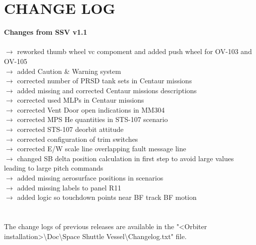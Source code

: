 \documentclass[Space_Shuttle_Vessel_Manual.tex]{subfiles}
\begin{document}
\section{CHANGE LOG}
\label{sec:change-log}
\noindent
\textbf{Changes from SSV v1.1}\\\\
$\rightarrow$ reworked thumb wheel vc compoment and added push wheel for OV-103 and OV-105\\
$\rightarrow$ added Caution \& Warning system\\
$\rightarrow$ corrected number of PRSD tank sets in Centaur missions\\
$\rightarrow$ added missing and corrected Centaur missions descriptions\\
$\rightarrow$ corrected used MLPs in Centaur missions\\
$\rightarrow$ corrected Vent Door open indications in MM304\\
$\rightarrow$ corrected MPS He quantities in STS-107 scenario\\
$\rightarrow$ corrected STS-107 deorbit attitude\\
$\rightarrow$ corrected configuration of trim switches\\
$\rightarrow$ corrected E/W scale line overlapping fault message line\\
$\rightarrow$ changed SB delta position calculation in first step to avoid large values leading to large pitch commands\\
$\rightarrow$ added missing aerosurface positions in scenarios\\
$\rightarrow$ added missing labels to panel R11\\
$\rightarrow$ added logic so touchdown points near BF track BF motion\\
\\
\\
The change logs of previous releases are available in the "<Orbiter installation>\textbackslash Doc\textbackslash Space Shuttle Vessel\textbackslash Changelog.txt" file.
\end{document}
